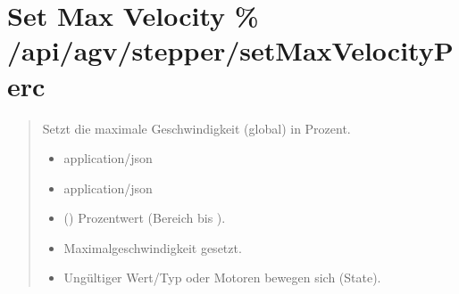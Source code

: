 \documentclass[letterpaper,10pt,english]{sphinxmanual}
\begin{document}
\section{Set Max Velocity \% \textendash{} /api/agv/stepper/setMaxVelocityPerc}
\label{\detokenize{agv_rest_api_stepper:set-max-velocity-api-agv-stepper-setmaxvelocityperc}}\label{\detokenize{agv_rest_api_stepper:post-api-agv-stepper-setmaxvelocityperc}}

\begin{fulllineitems}
\label{\detokenize{agv_rest_api_stepper:post--api-agv-stepper-setMaxVelocityPerc}}
\pysigstartsignatures
\pysigline
{}
\pysigstopsignatures\begin{quote}\begin{description}
\sphinxAtStartPar
Setzt die maximale Geschwindigkeit (global) in Prozent.

\begin{itemize}
\item {} 
\sphinxAtStartPar
{} \textendash{} application/json

\end{itemize}

\begin{itemize}
\item {} 
\sphinxAtStartPar
{} \textendash{} application/json

\end{itemize}

\begin{itemize}
\item {} 
\sphinxAtStartPar
{} () \textendash{} Prozentwert (Bereich  bis ).

\end{itemize}

\begin{itemize}
\item {} 
\sphinxAtStartPar
{} \textendash{} Maximalgeschwindigkeit gesetzt.

\item {} 
\sphinxAtStartPar
{} \textendash{} Ungültiger Wert/Typ oder Motoren bewegen sich (State).

\end{itemize}

\end{description}\end{quote}

\end{fulllineitems}
\end{document}
